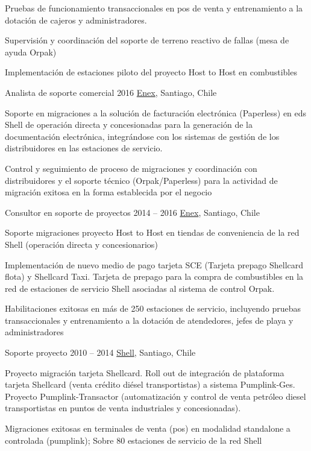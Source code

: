 \begin{joblist}[12.8][8.4][4]
{    \checkmark  Pruebas de funcionamiento transaccionales en pos de venta y entrenamiento a la dotación de cajeros y administradores.

    \checkmark  Supervisión y coordinación del soporte de terreno reactivo de fallas (mesa de ayuda Orpak)

    \checkmark  Implementación de estaciones piloto del proyecto Host to Host en combustibles
  }


\item[Analista de soporte comercial]{2016}
  {
  \href{https://www.enex.cl/}{Enex}, Santiago, Chile}
  {
    Soporte en migraciones a la solución de facturación electrónica (Paperless) en eds Shell de operación directa y concesionadas para la generación de la documentación electrónica, integrándose con los sistemas de gestión de los distribuidores en las estaciones de servicio.

    \checkmark  Control y seguimiento de proceso de migraciones y coordinación con distribuidores y el soporte técnico (Orpak/Paperless) para la actividad de migración exitosa en la forma establecida por el negocio
  }


\item[Consultor en soporte de proyectos]{2014 -- 2016}
  {
  \href{https://www.enex.cl/}{Enex}, Santiago, Chile}
  {
    Soporte migraciones proyecto Host to Host en tiendas de conveniencia de la red Shell (operación directa y concesionarios)

    Implementación de nuevo medio de pago tarjeta SCE (Tarjeta prepago Shellcard flota) y Shellcard Taxi. Tarjeta de prepago para la compra de combustibles en la red de estaciones de servicio Shell asociadas al sistema de control Orpak.

    \checkmark   Habilitaciones exitosas en más de 250 estaciones de servicio, incluyendo pruebas transaccionales y entrenamiento a la dotación de atendedores, jefes de playa y administradores
  }

\item[Soporte proyecto]{2010 -- 2014}
  {
  \href{https://www.shell.com/}{Shell}, Santiago, Chile}
  {
    Proyecto migración tarjeta Shellcard. Roll out de integración de plataforma tarjeta Shellcard (venta crédito diésel transportistas) a sistema Pumplink-Ges. Proyecto Pumplink-Transactor (automatización y control de venta petróleo diesel transportistas en puntos de venta industriales y concesionadas).

    \checkmark Migraciones exitosas en terminales de venta (pos) en modalidad standalone a controlada (pumplink); Sobre 80 estaciones de servicio de la red Shell

}
\end{joblist}
